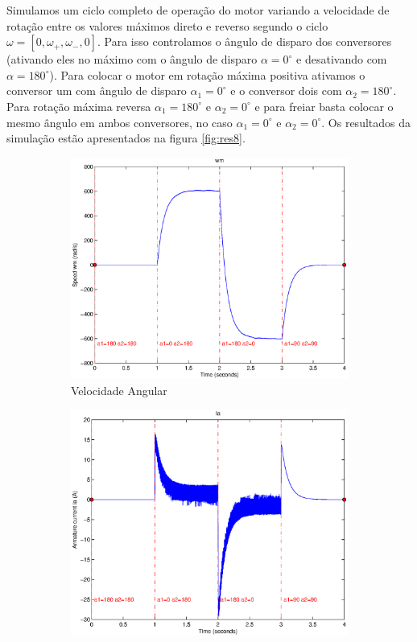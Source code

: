 \documentclass{article}
\begin{document}
Simulamos um ciclo completo de operação do motor variando a velocidade de rotação entre os valores máximos direto e reverso segundo o ciclo $\omega = [0,\omega_+,\omega_-, 0]$. Para isso controlamos o ângulo de disparo dos conversores (ativando eles no máximo com o ângulo de disparo $\alpha = 0^\circ$ e desativando com $\alpha = 180^\circ$). Para colocar o motor em rotação máxima positiva ativamos o conversor um com ângulo de disparo $\alpha_1 = 0^\circ$ e o conversor dois com $\alpha_2 = 180^\circ$. Para rotação máxima reversa $\alpha_1 = 180^\circ$ e $\alpha_2 = 0^\circ$ e para freiar basta colocar o mesmo ângulo em ambos conversores, no caso $\alpha_1 = 0^\circ$ e $\alpha_2 = 0^\circ$. Os resultados da simulação estão apresentados na figura \ref{fig:res8}.
\begin{figure}[H]
	\centering
	\begin{subfigure}[b]{0.49\linewidth}
		\includegraphics[width=\linewidth]{matlab/wm8}
		\caption{Velocidade Angular}
	\end{subfigure}
	\begin{subfigure}[b]{0.49\linewidth}
		\centering
		\includegraphics[width=\linewidth]{matlab/ia8}

\end{subfigure}
\end{figure}
\end{document}
